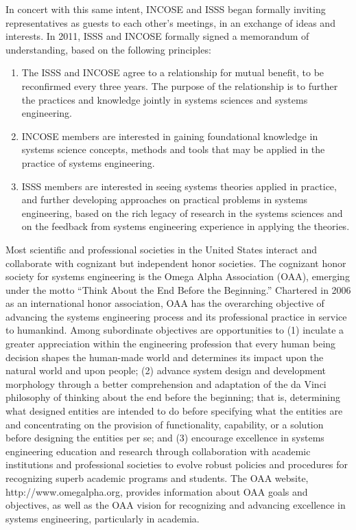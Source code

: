 In concert with this same intent, INCOSE and ISSS began formally inviting representatives as guests to each other’s meetings, in an exchange of ideas and interests. In 2011, ISSS and INCOSE formally signed a memorandum of understanding, based on the following principles:

\begin{enumerate}
\item The ISSS and INCOSE agree to a relationship for mutual benefit, to be reconfirmed every three years. The purpose of the relationship is to further the practices and knowledge jointly in systems sciences and systems engineering.
\item INCOSE members are interested in gaining foundational knowledge in systems science concepts, methods and tools that may be applied in the practice of systems engineering.
\item ISSS members are interested in seeing systems theories applied in practice, and further developing approaches on practical problems in systems engineering, based on the rich legacy of research in the systems sciences and on the feedback from systems engineering experience in applying the theories.
\end{enumerate}

Most scientific and professional societies in the United States interact and collaborate with cognizant but independent honor societies. The cognizant honor society for systems engineering is the Omega Alpha Association (OAA), emerging under the motto “Think About the End Before the Beginning.”  Chartered in 2006 as an international honor association, OAA has the overarching objective of advancing the systems engineering process and its professional practice in service to humankind. Among subordinate objectives are opportunities to (1) inculate a greater appreciation within the engineering profession that every human being decision shapes the human-made world and determines its impact upon the natural world and upon people; (2) advance system design and development morphology through a better comprehension and adaptation of the da Vinci philosophy of thinking about the end before the beginning; that is, determining what designed entities are intended to do before specifying what the entities are and concentrating on the provision of functionality, capability, or a solution before designing the entities per se; and (3) encourage excellence in systems engineering education and research through collaboration with academic institutions and professional societies to evolve robust policies and procedures for recognizing superb academic programs and students. The OAA website, http://www.omegalpha.org, provides information about OAA goals and objectives, as well as the OAA vision for recognizing and advancing excellence in systems engineering, particularly in academia.